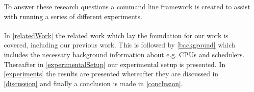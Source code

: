 
To answer these research questions a command line framework is created to assist with running a series of different experiments.

\paragraph{}
In \cref{relatedWork} the related work which lay the foundation for our work is covered, including our previous work. This is followed by \cref{background} which includes the necessary background information about e.g. CPUs and schedulers. Thereafter in \cref{experimentalSetup} our experimental setup is presented. %
In \cref{experiments} the results are presented whereafter they are discussed in \cref{discussion} and finally a conclusion is made in \cref{conclusion}. 


